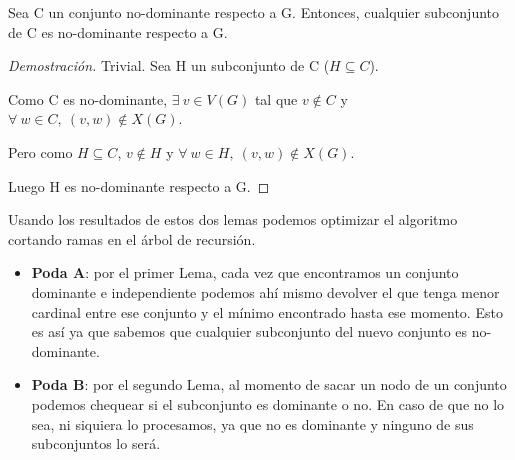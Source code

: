     \begin{lemma}
        Sea C un conjunto no-dominante respecto a G. Entonces, cualquier subconjunto de C es no-dominante respecto a G.
    \end{lemma}
    \begin{proof}[Demostración]
        Trivial. Sea H un subconjunto de C ($H \subseteq C$).

        Como C es no-dominante, $\exists\ v \in V(G)$ tal que $v \notin C$ y $\forall\ w \in C,\ (v,w) \notin X(G)$.

        Pero como $H \subseteq C$, $v \notin H$ y $\forall\ w \in H,\ (v,w) \notin X(G)$.

        Luego H es no-dominante respecto a G.
    \end{proof}

    Usando los resultados de estos dos lemas podemos optimizar el algoritmo cortando ramas en el árbol de recursión.
    \begin{itemize}
        \item \textbf{Poda A}: por el primer Lema, cada vez que encontramos un conjunto dominante e independiente podemos ahí mismo devolver el que tenga menor cardinal entre ese conjunto y el mínimo encontrado hasta ese momento. Esto es así ya que sabemos que cualquier subconjunto del nuevo conjunto es no-dominante.
        \item \textbf{Poda B}: por el segundo Lema, al momento de sacar un nodo de un conjunto podemos chequear si el subconjunto es dominante o no. En caso de que no lo sea, ni siquiera lo procesamos, ya que no es dominante y ninguno de sus subconjuntos lo será.
    \end{itemize}
